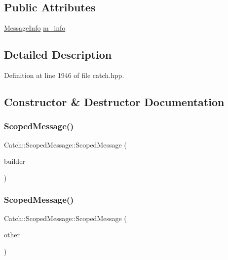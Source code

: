 \subsection*{Public Attributes}
\begin{DoxyCompactItemize}
\item 
\hyperlink{struct_catch_1_1_message_info}{Message\+Info} \hyperlink{class_catch_1_1_scoped_message_ae6e1476f389cc6e1586f033b3747b27b}{m\+\_\+info}
\end{DoxyCompactItemize}


\subsection{Detailed Description}


Definition at line 1946 of file catch.\+hpp.



\subsection{Constructor \& Destructor Documentation}
\hypertarget{class_catch_1_1_scoped_message_a5cc59f0f2ebe840e6607f83004d49a17}{}\label{class_catch_1_1_scoped_message_a5cc59f0f2ebe840e6607f83004d49a17} 
\subsubsection{\texorpdfstring{Scoped\+Message()}{ScopedMessage()}\hspace{0.1cm}{\footnotesize\ttfamily [1/2]}}
{\footnotesize\ttfamily Catch\+::\+Scoped\+Message\+::\+Scoped\+Message (\begin{DoxyParamCaption}\item[{\hyperlink{struct_catch_1_1_message_builder}{Message\+Builder} const \&}]{builder }\end{DoxyParamCaption})}

\hypertarget{class_catch_1_1_scoped_message_ae03a17fd47220d563d4abc73e7518e29}{}\label{class_catch_1_1_scoped_message_ae03a17fd47220d563d4abc73e7518e29} 
\subsubsection{\texorpdfstring{Scoped\+Message()}{ScopedMessage()}\hspace{0.1cm}{\footnotesize\ttfamily [2/2]}}
{\footnotesize\ttfamily Catch\+::\+Scoped\+Message\+::\+Scoped\+Message (\begin{DoxyParamCaption}\item[{\hyperlink{class_catch_1_1_scoped_message}{Scoped\+Message} const \&}]{other }\end{DoxyParamCaption})}

